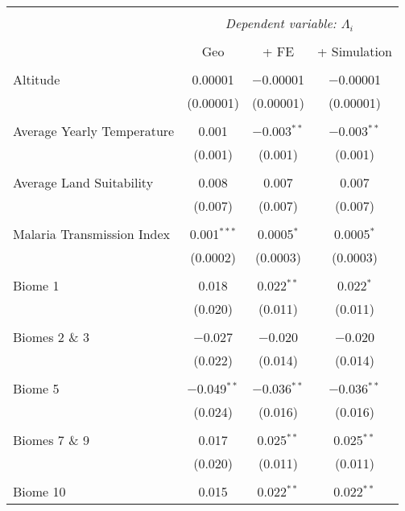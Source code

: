 \documentclass[11pt, oneside]{article}   	%
\begin{document}
\begin{spacing}{1.3}
\begin{table}[h]
{      \begin{tabular}{@{\extracolsep{0pt}}lccc}
      \\[-1.8ex]\hline
      \hline \\[-1.8ex]
       & \multicolumn{3}{c}{\textit{Dependent variable: $\Lambda_{i}$}} \\
      \cline{2-4}
      \\[-1.8ex] & Geo & + FE & + Simulation\\
      \hline \\[-1.8ex]
       Altitude & 0.00001 & $-$0.00001 & $-$0.00001 \\
        & (0.00001) & (0.00001) & (0.00001) \\
        & & & \\[-1.8ex]
       Average Yearly Temperature & 0.001 & $-$0.003$^{**}$ & $-$0.003$^{**}$ \\
        & (0.001) & (0.001) & (0.001) \\
        & & & \\[-1.8ex]
       Average Land Suitability & 0.008 & 0.007 & 0.007 \\
        & (0.007) & (0.007) & (0.007) \\
        & & & \\[-1.8ex]
       Malaria Transmission Index  & 0.001$^{***}$ & 0.0005$^{*}$ & 0.0005$^{*}$ \\
        & (0.0002) & (0.0003) & (0.0003) \\
        & & & \\[-1.8ex]
       Biome 1 & 0.018 & 0.022$^{**}$ & 0.022$^{*}$ \\
        & (0.020) & (0.011) & (0.011) \\
        & & & \\[-1.8ex]
       Biomes 2 \& 3 & $-$0.027 & $-$0.020 & $-$0.020 \\
        & (0.022) & (0.014) & (0.014) \\
        & & & \\[-1.8ex]
       Biome 5 & $-$0.049$^{**}$ & $-$0.036$^{**}$ & $-$0.036$^{**}$ \\
        & (0.024) & (0.016) & (0.016) \\
        & & & \\[-1.8ex]
       Biomes 7 \& 9 & 0.017 & 0.025$^{**}$ & 0.025$^{**}$ \\
        & (0.020) & (0.011) & (0.011) \\
        & & & \\[-1.8ex]
       Biome 10 & 0.015 & 0.022$^{**}$ & 0.022$^{**}$ \\

\end{tabular}}
\end{table}
\end{spacing}
\end{document}
